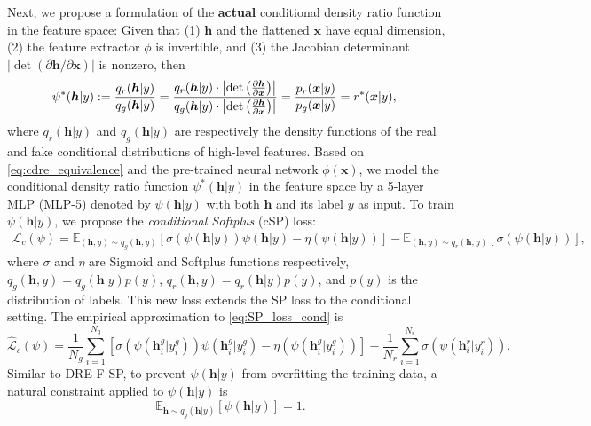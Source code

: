 \documentclass[final,12pt, 3p,times]{elsarticle}
\newcommand\scalemath[2]{\scalebox{#1}{\mbox{\ensuremath{\displaystyle #2}}}}  \def\todo#1{\textcolor{red}{#1}}
\begin{document}
Next, we propose a formulation of the \textbf{actual} conditional density ratio function in the feature space: Given that (1) $\bm{h}$ and the flattened $\bm{x}$ have equal dimension, (2) the feature extractor $\phi$ is invertible, and (3) the Jacobian determinant $|\det({\partial \bm{h}}/{\partial \bm{x}})|$ is nonzero, then
\begin{equation}
	\label{eq:cdre_equivalence}
	\scalemath{1}{
		\begin{aligned}
			\psi^*(\bm{h}|y)&:=\frac{q_r(\bm{h}|y)}{q_g(\bm{h}|y)}=\frac{q_r(\bm{h}|y)\cdot\left|\det\left(\frac{\partial\bm{h}}{\partial\bm{x}}\right)\right|}{q_g(\bm{h}|y)\cdot \left|\det\left(\frac{\partial\bm{h}}{\partial\bm{x}}\right)\right|} =\frac{p_r(\bm{x}|y)}{p_g(\bm{x}|y)} = r^*(\bm{x}|y),
		\end{aligned}
	}
\end{equation}
where $q_r(\bm{h}|y)$ and $q_g(\bm{h}|y)$ are respectively the density functions of the real and fake conditional distributions of high-level features. Based on \cref{eq:cdre_equivalence} and the pre-trained neural network $\phi(\bm{x})$, we model the conditional density ratio function $\psi^*(\bm{h}|y)$ in the feature space by a 5-layer MLP (MLP-5) denoted by $\psi(\bm{h}|y)$ with both $\bm{h}$ and its label $y$ as input. To train $\psi(\bm{h}|y)$, we propose the \textit{conditional Softplus} (cSP) loss: 
\begin{align}
	\mathcal{L}_c(\psi) = \mathbb{E}_{(\bm{h},y)\sim q_g(\bm{h},y)}\left[\sigma(\psi(\bm{h}|y)) \psi(\bm{h}|y) - \eta(\psi(\bm{h}|y)) \right]  - \mathbb{E}_{(\bm{h},y)\sim q_r(\bm{h},y)}\left[ \sigma(\psi(\bm{h}|y)) \right],
	\label{eq:SP_loss_cond}
\end{align}
where $\sigma$ and $\eta$ are Sigmoid and Softplus functions respectively, $q_g(\bm{h},y)=q_g(\bm{h}|y)p(y)$, $q_r(\bm{h},y)=q_r(\bm{h}|y)p(y)$, and $p(y)$ is the distribution of labels. This new loss extends the SP loss \cite{ding2020subsampling} to the conditional setting. The empirical approximation to \cref{eq:SP_loss_cond} is 
\begin{equation}
	\widehat{\mathcal{L}}_c(\psi) = \frac{1}{N_g}\sum_{i=1}^{N_g}\left[ \sigma(\psi(\bm{h}_i^g|y_i^g))\psi(\bm{h}_i^g|y_i^g) -\eta(\psi(\bm{h}_i^g|y_i^g)) \right]  - \frac{1}{N_r}\sum_{i=1}^{N_r}\sigma(\psi(\bm{h}_i^r|y_i^r)).
	\label{eq:emp_SP_loss_cond}
\end{equation}
Similar to DRE-F-SP, to prevent $\psi(\bm{h}|y)$ from overfitting the training data, a natural constraint applied to $\psi(\bm{h}|y)$ is 
\begin{equation}
	\label{eq:cond_constraint}
	\mathbb{E}_{\bm{h}\sim q_g(\bm{h}|y)} [\psi(\bm{h}|y)] =1.
\end{equation}
\end{document}
